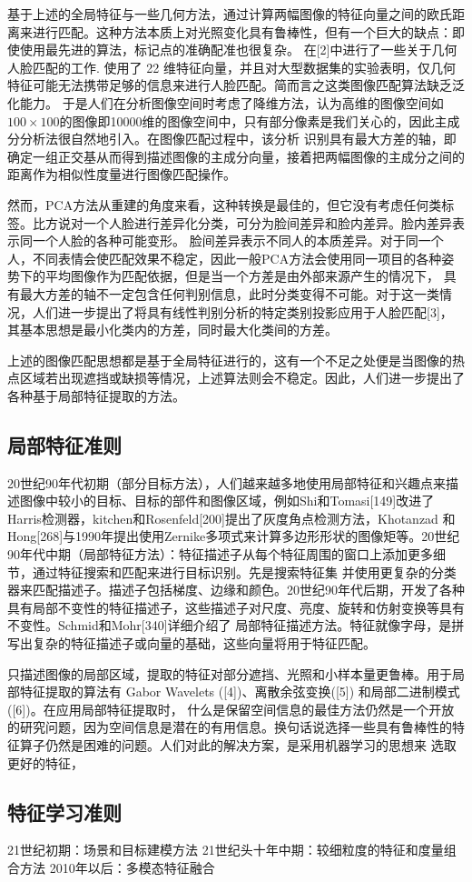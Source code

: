 基于上述的全局特征与一些几何方法，通过计算两幅图像的特征向量之间的欧氏距离来进行匹配。这种方法本质上对光照变化具有鲁棒性，但有一个巨大的缺点：即使使用最先进的算法，标记点的准确配准也很复杂。
在[2]中进行了一些关于几何人脸匹配的工作. 使用了 22 维特征向量，并且对大型数据集的实验表明，仅几何特征可能无法携带足够的信息来进行人脸匹配。简而言之这类图像匹配算法缺乏泛化能力。
于是人们在分析图像空间时考虑了降维方法，认为高维的图像空间如$100 \times 100$的图像即10000维的图像空间中，只有部分像素是我们关心的，因此主成分分析法很自然地引入。在图像匹配过程中，该分析
识别具有最大方差的轴，即确定一组正交基从而得到描述图像的主成分向量，接着把两幅图像的主成分之间的距离作为相似性度量进行图像匹配操作。

然而，PCA方法从重建的角度来看，这种转换是最佳的，但它没有考虑任何类标签。比方说对一个人脸进行差异化分类，可分为脸间差异和脸内差异。脸内差异表示同一个人脸的各种可能变形。
脸间差异表示不同人的本质差异。对于同一个人，不同表情会使匹配效果不稳定，因此一般PCA方法会使用同一项目的各种姿势下的平均图像作为匹配依据，但是当一个方差是由外部来源产生的情况下，
具有最大方差的轴不一定包含任何判别信息，此时分类变得不可能。对于这一类情况，人们进一步提出了将具有线性判别分析的特定类别投影应用于人脸匹配[3]，其基本思想是最小化类内的方差，同时最大化类间的方差。

上述的图像匹配思想都是基于全局特征进行的，这有一个不足之处便是当图像的热点区域若出现遮挡或缺损等情况，上述算法则会不稳定。因此，人们进一步提出了各种基于局部特征提取的方法。

\subsection{局部特征准则}

20世纪90年代初期（部分目标方法），人们越来越多地使用局部特征和兴趣点来描述图像中较小的目标、目标的部件和图像区域，例如Shi和Tomasi[149]改进了Harris检测器，kitchen和Rosenfeld[200]提出了灰度角点检测方法，Khotanzad
和Hong[268]与1990年提出使用Zernike多项式来计算多边形形状的图像矩等。20世纪90年代中期（局部特征方法）：特征描述子从每个特征周围的窗口上添加更多细节，通过特征搜索和匹配来进行目标识别。先是搜索特征集
并使用更复杂的分类器来匹配描述子。描述子包括梯度、边缘和颜色。20世纪90年代后期，开发了各种具有局部不变性的特征描述子，这些描述子对尺度、亮度、旋转和仿射变换等具有不变性。Schmid和Mohr[340]详细介绍了
局部特征描述方法。特征就像字母，是拼写出复杂的特征描述子或向量的基础，这些向量将用于特征匹配。

只描述图像的局部区域，提取的特征对部分遮挡、光照和小样本量更鲁棒。用于局部特征提取的算法有 Gabor Wavelets ([4])、离散余弦变换([5]) 和局部二进制模式 ([6])。在应用局部特征提取时，
什么是保留空间信息的最佳方法仍然是一个开放的研究问题，因为空间信息是潜在的有用信息。换句话说选择一些具有鲁棒性的特征算子仍然是困难的问题。人们对此的解决方案，是采用机器学习的思想来
选取更好的特征，

\subsection{特征学习准则}

21世纪初期：场景和目标建模方法
21世纪头十年中期：较细粒度的特征和度量组合方法
2010年以后：多模态特征融合